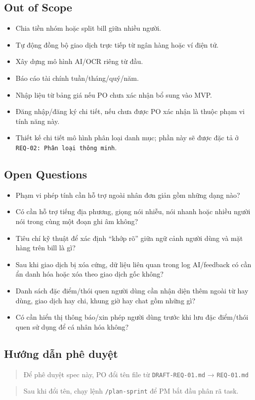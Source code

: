 \subsection{Out of Scope}

\begin{itemize}
\item Chia tiền nhóm hoặc split bill giữa nhiều người.
\item Tự động đồng bộ giao dịch trực tiếp từ ngân hàng hoặc ví điện tử.
\item Xây dựng mô hình AI/OCR riêng từ đầu.
\item Báo cáo tài chính tuần/tháng/quý/năm.
\item Nhập liệu từ bảng giá nếu PO chưa xác nhận bổ sung vào MVP.
\item Đăng nhập/đăng ký chi tiết, nếu chưa được PO xác nhận là thuộc phạm vi tính năng này.
\item Thiết kế chi tiết mô hình phân loại danh mục; phần này sẽ được đặc tả ở \texttt{REQ-02: Phân loại thông minh}.
\end{itemize}
\subsection{Open Questions}

\begin{itemize}
\item [ ] Phạm vi phép tính cần hỗ trợ ngoài nhân đơn giản gồm những dạng nào?
\item [ ] Có cần hỗ trợ tiếng địa phương, giọng nói nhiễu, nói nhanh hoặc nhiều người nói trong cùng một đoạn ghi âm không?
\item [ ] Tiêu chí kỹ thuật để xác định “khớp rõ” giữa ngữ cảnh người dùng và mặt hàng trên bill là gì?
\item [ ] Sau khi giao dịch bị xóa cứng, dữ liệu liên quan trong log AI/feedback có cần ẩn danh hóa hoặc xóa theo giao dịch gốc không?
\item [ ] Danh sách đặc điểm/thói quen người dùng cần nhận diện thêm ngoài từ hay dùng, giao dịch hay chi, khung giờ hay chat gồm những gì?
\item [ ] Có cần hiển thị thông báo/xin phép người dùng trước khi lưu đặc điểm/thói quen sử dụng để cá nhân hóa không?
\end{itemize}
\subsection{Hướng dẫn phê duyệt}

\begin{quote}
Để phê duyệt spec này, PO đổi tên file từ \texttt{DRAFT-REQ-01.md} → \texttt{REQ-01.md}
\end{quote}

\begin{quote}
Sau khi đổi tên, chạy lệnh \texttt{/plan-sprint} để PM bắt đầu phân rã task.
\end{quote}